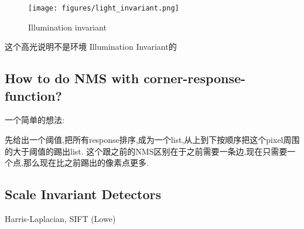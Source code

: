 \begin{figure}[htbp]
    \centering
    \texttt{[image: figures/light\_invariant.png]}
    \caption{Illumination invariant}
\end{figure}

这个高光说明不是环境 Illumination Invariant的

\subsection{How to do NMS with corner-response-function?}

一个简单的想法:

先给出一个阈值,把所有response排序,成为一个list,从上到下按顺序把这个pixel周围的大于阈值的踢出list.
这个跟之前的NMS区别在于之前需要一条边,现在只需要一个点,那么现在比之前踢出的像素点更多.

\subsection{Scale Invariant Detectors}

Harris-Laplacian, SIFT (Lowe)
